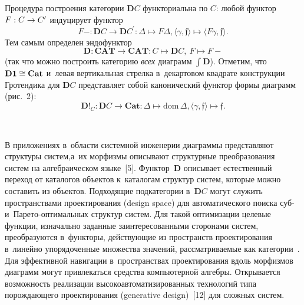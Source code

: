 \begin{multicols}{2}
     Процедура построения категории $\mathbf{D}C $ функториальна по $C$: 
любой функтор~$F : C\hm\to  C^\prime$ индуцирует функтор
     $$
     F- : \mathbf{D}C  \to \mathbf{D}C^\prime : \Delta \mapsto F\Delta, \langle 
\gamma, \mathfrak{f}\rangle \mapsto \langle F\gamma, \mathfrak{f}\rangle.
     $$
Тем самым определен эндофунктор
$$
     \mathbf{D} : \mathbf{CAT}\to \mathbf{CAT} : C \mapsto  
\mathbf{D}C ,\ F \mapsto F-
     $$
(так что можно построить категорию \textit{всех} диаграмм $\int \mathbf{D}$). 
Отметим, что $\mathbf{D1}\hm\cong \mathbf{Cat}$ и~левая вертикальная 
стрелка в~декартовом квадрате конструкции Гротендика для $\mathbf{D}C$ 
представляет собой канонический функтор формы диаграмм (рис.~2):
$$
     \mathbf{D}!_C : \mathbf{D}C  \to \mathbf{Cat} : \Delta 
\mapsto \mathrm{dom}\,\Delta, \langle \gamma, 
\mathfrak{f}\rangle \mapsto \mathfrak{f}.
     $$
     
     \begin{figure*} %
    \vspace*{1pt}
      \begin{center}
   \mbox{%
\epsfxsize=106.769mm 
}
\end{center}
\vspace*{-12pt}
\vspace*{-6pt}
\end{figure*}
     
     В приложениях в~области системной инженерии диаграммы 
представляют структуры систем,\linebreak а~их морфизмы описывают структурные 
преобразования систем на алгебраическом языке~[5]. Функтор~$\mathbf{D}$ 
описывает естественный переход от каталогов объектов к~каталогам структур 
сис\-тем, \mbox{которые} можно составить из объектов. Подходящие подкатегории 
в~$\mathbf{D}C $ могут служить пространствами проектирования (design 
space) для автоматического поиска суб- и~Па\-ре\-то-оп\-ти\-маль\-ных структур 
сис\-тем. Для такой оптимизации целевые функции, изначально заданные 
заинтересованными сторонами систем, преобразуются в~функторы, 
действующие из пространств проектирования в~линейно упорядоченные 
множества значений, рассматриваемые как категории~\cite{11-kov}. Для 
эффективной навигации в~пространствах проектирования вдоль морфизмов 
диаграмм могут привлекаться средства компьютерной алгебры. Открывается 
возможность реализации высокоавтоматизированных технологий типа 
порождающего проектирования (generative design)~[12] для сложных систем.


\end{multicols}
